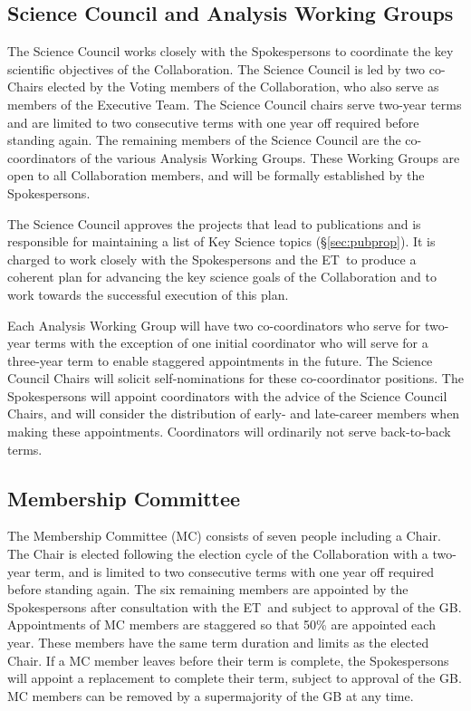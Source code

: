 \documentclass[12pt]{article}
\newcommand{\exec}{{Executive Team}}
\newcommand{\shorte}{{ET}}  %
\begin{document}
\subsection{Science Council and Analysis Working Groups}
\label{sec:SC}

The Science Council works closely with the Spokespersons to coordinate the key scientific objectives of the Collaboration.  The Science Council is led by two co-Chairs elected by the Voting members of the Collaboration, who also serve as members of the \exec. The Science Council chairs serve two-year terms and are limited to two consecutive terms with one year off required before standing again.
The remaining members of the Science Council are the co-coordinators of the various Analysis Working Groups. These Working Groups are open to all Collaboration members, and will be formally established by the Spokespersons.

The Science Council approves the projects that lead to publications and is responsible for maintaining a list of Key Science topics  (\S\ref{sec:pubprop}). It is charged to work closely with the Spokespersons and the \shorte\ to produce a coherent plan for advancing the key science goals of the Collaboration and to work towards the successful execution of this plan.

Each Analysis Working Group will have two co-coordinators who  serve for two-year terms with the exception of one initial coordinator who will serve for a three-year term to enable staggered appointments in the future.  The Science Council Chairs will solicit self-nominations for these co-coordinator positions. The Spokespersons will appoint coordinators with the advice of the Science Council Chairs, and will consider the distribution of early- and late-career members when making these appointments. Coordinators will ordinarily not serve back-to-back terms.\\


\subsection{Membership Committee}

The Membership Committee (MC) consists of seven people including a Chair. The Chair is elected following the election cycle of the Collaboration with a  two-year term, and is limited to two consecutive terms with one year off required before standing again. The six remaining members are appointed by the Spokespersons after consultation with the \shorte\ and subject to approval of the GB. Appointments of MC members are staggered so that 50\% are appointed each year. These members have the same term duration and limits as the elected Chair. If a MC member leaves before their term is complete, the Spokespersons will appoint a replacement to complete their term, subject to approval of the GB.   MC members can be removed by a supermajority of the GB at any time.
\end{document}
